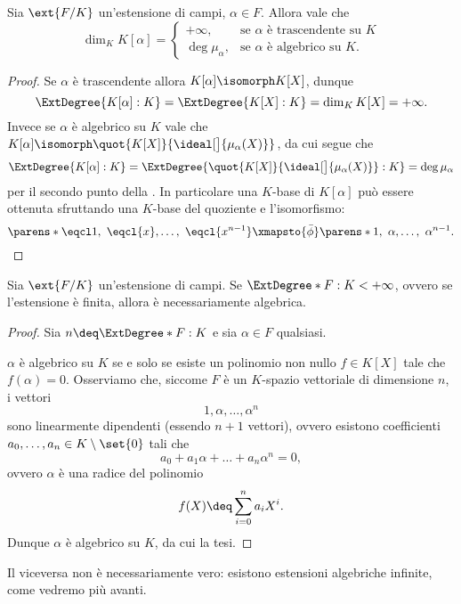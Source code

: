 \begin{proposition}
    Sia $\ext{F/K}$ un'estensione di campi, $\alpha \in F$. Allora vale che \[
        \dim_K K[\alpha] = \begin{cases}
            +\infty, &\text{se $\alpha$ è trascendente su $K$}\\
            \deg \mu_\alpha, &\text{se $\alpha$ è algebrico su $K$.}
        \end{cases}    
    \]
\end{proposition}
\begin{proof}
    Se $\alpha$ è trascendente allora $K[\alpha] \isomorph K[X]$, dunque \[
        \ExtDegree{K[\alpha]: K} = \ExtDegree{K[X]: K} = \dim_K K[X] = +\infty.
    \] Invece se $\alpha$ è algebrico su $K$ vale che $K[\alpha] \isomorph \quot{K[X]}{\ideal[\big]{\mu_\alpha(X)}}$, da cui segue che \[
        \ExtDegree{K[\alpha]: K} = \ExtDegree{\quot{K[X]}{\ideal[\big]{\mu_\alpha(X)}} : K} = \deg \mu_\alpha
    \] per il secondo punto della . In particolare una $K$-base di $K[\alpha]$ può essere ottenuta sfruttando una $K$-base del quoziente e l'isomorfismo: \[
        \parens*{\eqcl 1,\ \eqcl{x}, \dots,\ \eqcl{x^{n-1}}} \xmapsto{\bar\phi} \parens*{1,\ \alpha, \dots,\ \alpha^{n-1}}.    
    \]
\end{proof}

\begin{proposition}
    Sia $\ext{F/K}$ un'estensione di campi. Se $\ExtDegree*{F : K} < +\infty$, ovvero se l'estensione è finita, allora è necessariamente algebrica.
\end{proposition}
\begin{proof}
    Sia $n \deq \ExtDegree*{F : K}$ e sia $\alpha \in F$ qualsiasi.

    $\alpha$ è algebrico su $K$ se e solo se esiste un polinomio non nullo $f \in K[X]$ tale che $f(\alpha) = 0$. Osserviamo che, siccome $F$ è un $K$-spazio vettoriale di dimensione $n$, i vettori \[
        1, \alpha, \dots, \alpha^n    
    \] sono linearmente dipendenti (essendo $n+1$ vettori), ovvero esistono coefficienti $a_0, \dots, a_n \in K \setminus \set{0}$ tali che \[
        a_0 + a_1\alpha + \dots + a_n\alpha^n = 0,    
    \] ovvero $\alpha$ è una radice del polinomio \[
        f(X) \deq \sum_{i=0}^n a_iX^i.
    \] Dunque $\alpha$ è algebrico su $K$, da cui la tesi.
\end{proof}

Il viceversa non è necessariamente vero: esistono estensioni algebriche infinite, come vedremo più avanti.

